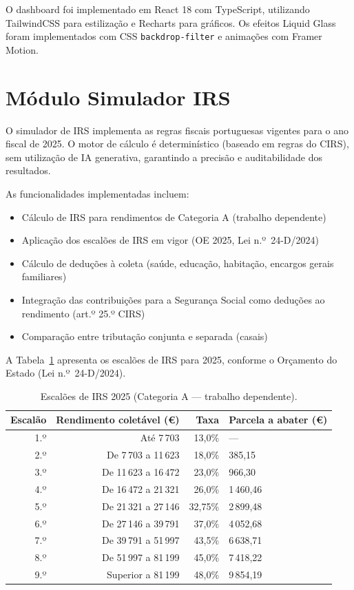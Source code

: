 O dashboard foi implementado em React 18 com TypeScript, utilizando TailwindCSS para estilização e Recharts para gráficos. Os efeitos Liquid Glass foram implementados com CSS \texttt{backdrop-filter} e animações com Framer Motion.



\section{Módulo Simulador IRS}
\label{sec:impl-irs}

O simulador de \ac{IRS} implementa as regras fiscais portuguesas vigentes para o ano fiscal de 2025. O motor de cálculo é determinístico (baseado em regras do \ac{CIRS}), sem utilização de \ac{IA} generativa, garantindo a precisão e auditabilidade dos resultados.

As funcionalidades implementadas incluem:
\begin{itemize}
    \item Cálculo de \ac{IRS} para rendimentos de Categoria A (trabalho dependente)
    \item Aplicação dos escalões de \ac{IRS} em vigor (OE 2025, Lei n.º~24-D/2024)
    \item Cálculo de deduções à coleta (saúde, educação, habitação, encargos gerais familiares)
    \item Integração das contribuições para a Segurança Social como deduções ao rendimento (art.º 25.º \ac{CIRS})
    \item Comparação entre tributação conjunta e separada (casais)
\end{itemize}

A Tabela~\ref{tab:escaloes-irs-2025} apresenta os escalões de \ac{IRS} para 2025, conforme o Orçamento do Estado (Lei n.º~24-D/2024).

\begin{table}[H]
\centering
\caption{Escalões de IRS 2025 (Categoria A --- trabalho dependente).}
\label{tab:escaloes-irs-2025}
\small
\begin{tabularx}{\textwidth}{r r r X}
\toprule
\textbf{Escalão} & \textbf{Rendimento coletável (€)} & \textbf{Taxa} & \textbf{Parcela a abater (€)} \\
\midrule
1.º & Até 7\,703 & 13,0\% & --- \\
2.º & De 7\,703 a 11\,623 & 18,0\% & 385,15 \\
3.º & De 11\,623 a 16\,472 & 23,0\% & 966,30 \\
4.º & De 16\,472 a 21\,321 & 26,0\% & 1\,460,46 \\
5.º & De 21\,321 a 27\,146 & 32,75\% & 2\,899,48 \\
6.º & De 27\,146 a 39\,791 & 37,0\% & 4\,052,68 \\
7.º & De 39\,791 a 51\,997 & 43,5\% & 6\,638,71 \\
8.º & De 51\,997 a 81\,199 & 45,0\% & 7\,418,22 \\
9.º & Superior a 81\,199 & 48,0\% & 9\,854,19 \\
\bottomrule
\end{tabularx}
\end{table}


